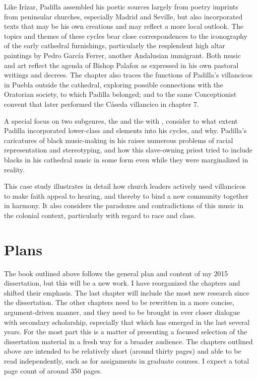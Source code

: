 \documentclass{vcbook-proposal}
\begin{document}
Like Irízar, Padilla assembled his poetic sources largely from poetry imprints from peninsular churches, especially Madrid and Seville, but also incorporated texts that may be his own creations and may reflect a more local outlook.
The topics and themes of these cycles bear close correspondences to the iconography of the early cathedral furnishings, particularly the resplendent high altar paintings by Pedro García Ferrer, another Andalusian immigrant.
Both  music and art reflect the agenda of Bishop Palafox as expressed in his own pastoral writings and decrees.
The chapter also traces the functions of Padilla's villancicos in Puebla outside the cathedral, exploring possible connections with the Oratorian society, to which Padilla belonged; and to the same Conceptionist convent that later performed the Cáseda villancico in chapter 7.

A special focus on two subgenres, the  and the  with , consider to what extent Padilla incorporated lower-class and  elements into his cycles, and why.
Padilla's caricatures of black music-making in his  raises numerous problems of racial representation and stereotyping, and how this slave-owning priest tried to include blacks in his cathedral music in some form even while they were marginalized in reality.

This case study illustrates in detail how church leaders actively used villancicos to make faith appeal to hearing, and thereby to bind a new community together in harmony.
It also considers the paradoxes and contradictions of this music in the colonial context, particularly with regard to race and class.

\section{Plans}

The book outlined above follows the general plan and content of my 2015 dissertation, but this will be a new work.
I have reorganized the chapters and shifted their emphasis.
The last chapter will include the most new research since the dissertation.
The other chapters need to be rewritten in a more concise, argument-driven manner, and they need to be brought in ever closer dialogue with secondary scholarship, especially that which has emerged in the last several years.
For the most part this is a matter of presenting a focused selection of the dissertation material in a fresh way for a broader audience.
The chapters outlined above are intended to be relatively short (around thirty pages) and able to be read independently, such as for assignments in graduate courses.
I expect a total page count of around 350 pages.
\end{document}
